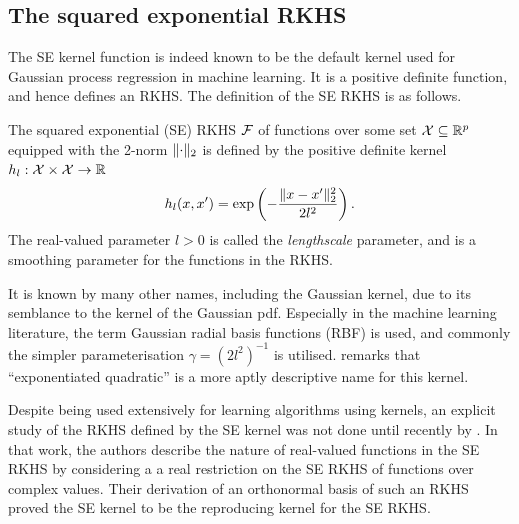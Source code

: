 \subsection{The squared exponential RKHS}

The \gls*{SE} kernel function is indeed known to be the default kernel used for Gaussian process regression in machine learning.
It is a positive definite function, and hence defines an RKHS.
The definition of the SE RKHS is as follows.

\begin{definition}
  The squared exponential (SE) RKHS ${\mathcal F}$ of functions over some set ${\mathcal X} \subseteq \mathbb{R}^p$ equipped with the 2-norm $\lVert\cdot\rVert_2$ is defined by the positive definite kernel $h_l:{\mathcal X}\times{\mathcal X}\to\mathbb{R}$ 
  \[
    h_l(x,x') = \exp\left( -\frac{\lVert x-x'\rVert_2^2}{2l^2} \right).
  \]
  The real-valued parameter $l > 0$ is called the \emph{lengthscale} parameter, and is a smoothing parameter for the functions in the RKHS.
\end{definition}

It is known by many other names, including the Gaussian kernel, due to its semblance to the kernel of the Gaussian pdf. 
Especially in the machine learning literature, the term Gaussian radial basis functions (RBF) is used, and commonly the simpler parameterisation $\gamma = (2l^2)^{-1}$ is utilised.
\citet{duvenaud2014automatic} remarks that ``exponentiated quadratic'' is a more aptly descriptive name for this kernel.

Despite being used extensively for learning algorithms using kernels, an explicit study of the RKHS defined by the SE kernel was not done until recently by \citet{steinwart2006explicit}.
In that work, the authors describe the nature of real-valued functions in the SE RKHS by considering a a real restriction on the SE RKHS of functions over complex values.
Their derivation of an orthonormal basis of such an RKHS proved the SE kernel to be the reproducing kernel for the SE RKHS.

